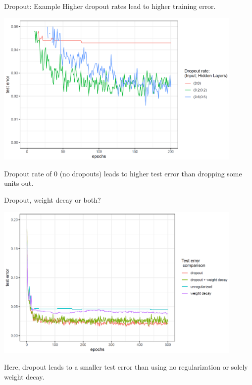 \begin{vbframe}{Dropout: Example}
Higher dropout rates lead to higher training error. 
\framebreak

\begin{center}
\includegraphics[width=0.9\textwidth]{plots/dropout02.png}
\end{center}

Dropout rate of 0 (no dropouts) leads to higher test error than dropping some units out. 
\end{vbframe}

\begin{vbframe}{Dropout, weight decay or both?}

\begin{center}
\includegraphics[width=0.9\textwidth]{plots/dropout03.png}
\end{center}

Here, dropout leads to a smaller test error than using no regularization or solely weight decay. 
\end{vbframe}

